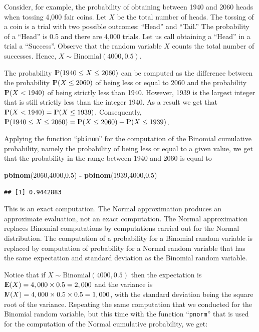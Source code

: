\documentclass[]{krantz}
\makeatletter
\newenvironment{Shaded}{\begin{snugshade}}{\end{snugshade}}
\newcommand{\DecValTok}[1]{\textcolor[rgb]{0.00,0.00,0.81}{#1}}
\newcommand{\FloatTok}[1]{\textcolor[rgb]{0.00,0.00,0.81}{#1}}
\newcommand{\KeywordTok}[1]{\textcolor[rgb]{0.13,0.29,0.53}{\textbf{#1}}}
\newcommand{\NormalTok}[1]{#1}
\newcommand{\OperatorTok}[1]{\textcolor[rgb]{0.81,0.36,0.00}{\textbf{#1}}}
\newcommand{\StringTok}[1]{\textcolor[rgb]{0.31,0.60,0.02}{#1}}
\newcommand{\Expec}{{\rm I\kern-.3em E}}
\newcommand{\Prob}{{\rm I\kern-.3em P}}
\newcommand{\Var}{{\rm I\kern-.3em V}}
\newenvironment{kframe}{%
\medskip{}
\setlength{\fboxsep}{.8em}
 \def\at@end@of@kframe{}%
 \ifinner\ifhmode%
  \def\at@end@of@kframe{\end{minipage}}%
  \begin{minipage}{\columnwidth}%
 \fi\fi%
 \def\FrameCommand##1{\hskip\@totalleftmargin \hskip-\fboxsep
 \colorbox{shadecolor}{##1}\hskip-\fboxsep
     \hskip-\linewidth \hskip-\@totalleftmargin \hskip\columnwidth}%
 \MakeFramed {\advance\hsize-\width
   \@totalleftmargin\z@ \linewidth\hsize
   \@setminipage}}%
 {\par\unskip\endMakeFramed%
 \at@end@of@kframe}
\renewenvironment{Shaded}{\begin{kframe}}{\end{kframe}}
\theoremstyle{definition}
\theoremstyle{definition}
\theoremstyle{definition}
\theoremstyle{remark}
\makeatother
\begin{document}
Consider, for example, the probability of obtaining between 1940 and
2060 heads when tossing 4,000 fair coins. Let \(X\) be the total number of
heads. The tossing of a coin is a trial with two possible outcomes:
``Head'' and ``Tail.'' The probability of a ``Head'' is 0.5 and there are
4,000 trials. Let us call obtaining a ``Head'' in a trial a ``Success''.
Observe that the random variable \(X\) counts the total number of
successes. Hence, \(X \sim \mathrm{Binomial}(4000,0.5)\).

The probability \(\Prob(1940 \leq X \leq 2060)\) can be computed as the
difference between the probability \(\Prob(X \leq 2060)\) of being less or
equal to 2060 and the probability \(\Prob(X < 1940)\) of being strictly
less than 1940. However, 1939 is the largest integer that is still
strictly less than the integer 1940. As a result we get that
\(\Prob(X < 1940) = \Prob(X \leq 1939)\). Consequently,
\(\Prob(1940 \leq X \leq 2060) = \Prob(X \leq 2060) - \Prob(X \leq 1939)\).

Applying the function ``\texttt{pbinom}'' for the computation of the Binomial
cumulative probability, namely the probability of being less or equal to
a given value, we get that the probability in the range between 1940 and
2060 is equal to

\begin{Shaded}
\begin{Highlighting}[]
\KeywordTok{pbinom}\NormalTok{(}\DecValTok{2060}\NormalTok{,}\DecValTok{4000}\NormalTok{,}\FloatTok{0.5}\NormalTok{) }\OperatorTok{-}\StringTok{ }\KeywordTok{pbinom}\NormalTok{(}\DecValTok{1939}\NormalTok{,}\DecValTok{4000}\NormalTok{,}\FloatTok{0.5}\NormalTok{)}
\end{Highlighting}
\end{Shaded}

\begin{verbatim}
## [1] 0.9442883
\end{verbatim}

This is an exact computation. The Normal approximation produces an
approximate evaluation, not an exact computation. The Normal
approximation replaces Binomial computations by computations carried out
for the Normal distribution. The computation of a probability for a
Binomial random variable is replaced by computation of probability for a
Normal random variable that has the same expectation and standard
deviation as the Binomial random variable.

Notice that if \(X \sim \mathrm{Binomial}(4000,0.5)\) then the expectation
is \(\Expec(X) = 4,000 \times 0.5 = 2,000\) and the variance is
\(\Var(X) = 4,000 \times 0.5 \times 0.5 = 1,000\), with the standard
deviation being the square root of the variance. Repeating the same
computation that we conducted for the Binomial random variable, but this
time with the function ``\texttt{pnorm}'' that is used for the computation of the
Normal cumulative probability, we get:
\end{document}
